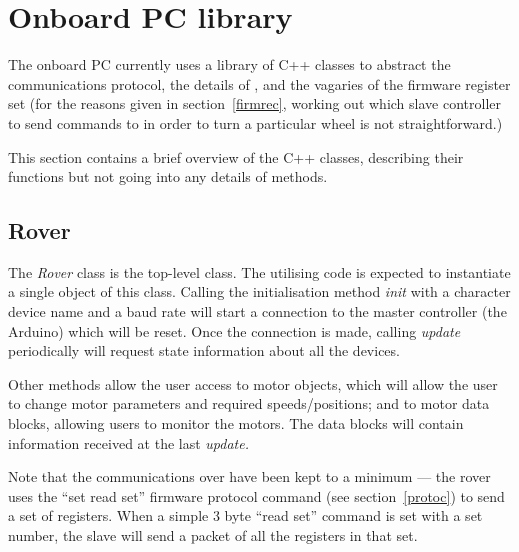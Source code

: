 %
%
%
%
% 
%
% 
% 
%

\section{Onboard PC library}
The onboard PC currently uses a library of C++ classes to abstract
the communications protocol, the details of \isqc{}, and
the vagaries of the firmware register set (for the reasons given
in section~\ref{firmrec}, working out which slave controller to send
commands to in order to turn a particular wheel is not straightforward.)

This section contains a brief overview of the C++ classes, describing their
functions but not going into any details of methods.


\subsection{Rover}
The \emph{Rover} class is the top-level class. The utilising code is expected
to instantiate a single object of this class. Calling the initialisation method
\emph{init} 
with a character device name and a baud rate will start a connection to the master
controller (the Arduino) which will be reset. Once the connection is made,
calling \emph{update} periodically will request state information about all the 
devices.

Other methods allow the user access to motor objects, which will allow the user
to change motor parameters and required speeds/positions; and to motor data
blocks, allowing users to monitor the motors. The data blocks will contain
information received at the last \emph{update.} 

Note that the communications over \isqc{} have been kept to a minimum --- the
rover uses the ``set read set'' firmware protocol command (see
section~\ref{protoc}) to send a set of registers. When a simple 3 byte ``read
set'' command is set with a set number, the slave will send a packet of all
the registers in that set.

